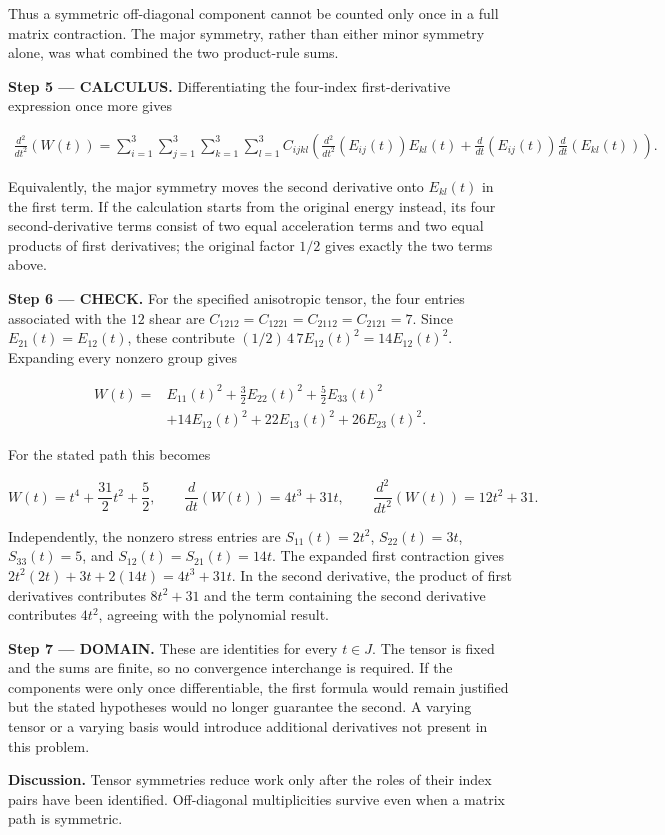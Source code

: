\documentclass[11pt,oneside,openany]{book}
\begin{document}
Thus a symmetric off-diagonal component cannot be counted only once in a full matrix contraction. The major symmetry, rather than either minor symmetry alone, was what combined the two product-rule sums.

\endgroup
\textbf{Step 5 --- CALCULUS.} Differentiating the four-index first-derivative expression once more gives

\[
\begin{aligned}
\frac{d^2}{dt^2}\left(W(t)\right)
=\sum_{i=1}^3\sum_{j=1}^3\sum_{k=1}^3\sum_{l=1}^3 C_{ijkl}
\left(
\frac{d^2}{dt^2}\left(E_{ij}(t)\right)E_{kl}(t)
+\frac{d}{dt}\left(E_{ij}(t)\right)\frac{d}{dt}\left(E_{kl}(t)\right)
\right).
\end{aligned}
\]

Equivalently, the major symmetry moves the second derivative onto \(E_{kl}(t)\) in the first term. If the calculation starts from the original energy instead, its four second-derivative terms consist of two equal acceleration terms and two equal products of first derivatives; the original factor \(1/2\) gives exactly the two terms above.

\textbf{Step 6 --- CHECK.} For the specified anisotropic tensor, the four entries associated with the \(12\) shear are \(C_{1212}=C_{1221}=C_{2112}=C_{2121}=7\). Since \(E_{21}(t)=E_{12}(t)\), these contribute \((1/2)\,4\,7E_{12}(t)^2=14E_{12}(t)^2\). Expanding every nonzero group gives

\[
\begin{aligned}
W(t)={}&E_{11}(t)^2+\frac32E_{22}(t)^2+\frac52E_{33}(t)^2\\
&+14E_{12}(t)^2+22E_{13}(t)^2+26E_{23}(t)^2.
\end{aligned}
\]

For the stated path this becomes

\[
W(t)=t^4+\frac{31}{2}t^2+\frac52,\qquad
\frac{d}{dt}\left(W(t)\right)=4t^3+31t,\qquad
\frac{d^2}{dt^2}\left(W(t)\right)=12t^2+31.
\]

Independently, the nonzero stress entries are \(S_{11}(t)=2t^2\), \(S_{22}(t)=3t\), \(S_{33}(t)=5\), and \(S_{12}(t)=S_{21}(t)=14t\). The expanded first contraction gives \(2t^2(2t)+3t+2(14t)=4t^3+31t\). In the second derivative, the product of first derivatives contributes \(8t^2+31\) and the term containing the second derivative contributes \(4t^2\), agreeing with the polynomial result.

\begin{DomainStep}
\textbf{Step 7 --- DOMAIN.} These are identities for every \(t\in J\). The tensor is fixed and the sums are finite, so no convergence interchange is required. If the components were only once differentiable, the first formula would remain justified but the stated hypotheses would no longer guarantee the second. A varying tensor or a varying basis would introduce additional derivatives not present in this problem.

\end{DomainStep}
\textbf{Discussion.} Tensor symmetries reduce work only after the roles of their index pairs have been identified. Off-diagonal multiplicities survive even when a matrix path is symmetric.
\clearpage
\end{document}
